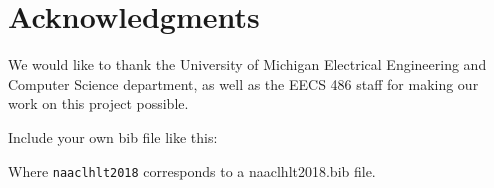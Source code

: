 \documentclass[11pt,a4paper]{article}
\begin{document}



\section*{Acknowledgments}

We would like to thank the University of Michigan Electrical Engineering and Computer Science department, as well as the EECS 486 staff for making our work on this project possible.


Include your own bib file like this:
\verb||
\verb||

Where \verb|naaclhlt2018| corresponds to a naaclhlt2018.bib file.



\appendix
\end{document}
